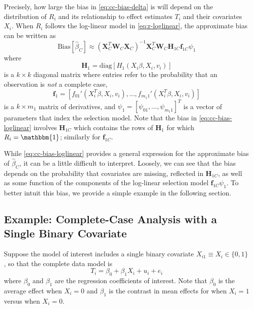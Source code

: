 \documentclass[
]{article}
\begin{document}
Precisely, how large the bias in \eqref{eq:cc-bias-delta} is will depend on the distribution of \(R_i\) and its relationship to effect estimates \(T_i\) and their covariates \(X_i\).
When \(R_i\) follows the log-linear model in \eqref{eq:r-loglinear}, the approximate bias can be written as
\begin{equation}
\text{Bias}[\hat{\beta}_C]
  \approx (\mathbf{X}_C^T \mathbf{W}_C \mathbf{X}_C)^{-1} \mathbf{X}_C^T \mathbf{W}_C \mathbf{H}_{1C}  \mathbf{f}_{1C} \psi_1
\label{eq:cc-bias-loglinear}
\end{equation}
where
\[
\mathbf{H}_1 = \text{diag}[H_1(X_i\beta, X_i, v_i)]
\]
is a \(k \times k\) diagonal matrix where entries refer to the probability that an observation is \emph{not} a complete case,
\[
\mathbf{f}_1 = \left[f_{01}'(X_i^T\beta, X_i, v_i), \ldots, f_{m_1 1}'(X_i^T\beta, X_i, v_i) \right]
\]
is a \(k \times m_1\) matrix of derivatives, and \(\psi_1 = [\psi_{01}, \ldots, \psi_{m_1 1}]^T\) is a vector of parameters that index the selection model.
Note that the bias in \eqref{eq:cc-bias-loglinear} involves \(\mathbf{H}_{1C}\) which contains the rows of \(\mathbf{H}_1\) for which \(R_i = \mathbbm{1}\); similarly for \(\mathbf{f}_{1C}\).

While \eqref{eq:cc-bias-loglinear} provides a general expression for the approximate bias of \(\hat{\beta}_C\), it can be a little difficult to interpret.
Loosely, we can see that the bias depends on the probability that covariates are missing, reflected in \(\mathbf{H}_{1C}\), as well as some function of the components of the log-linear selection model \(\mathbf{f}_{1C} \psi_1\).
To better intuit this bias, we provide a simple example in the following section.

\hypertarget{example-complete-case-analysis-with-a-single-binary-covariate}{%
\subsection{Example: Complete-Case Analysis with a Single Binary Covariate}\label{example-complete-case-analysis-with-a-single-binary-covariate}}

Suppose the model of interest includes a single binary covariate \(X_{i1} \equiv X_i \in \{0, 1\}\), so that the complete data model is
\begin{equation}
T_i = \beta_0 + \beta_1 X_i + u_i + e_i
\label{eq:cc-example}
\end{equation}
where \(\beta_0\) and \(\beta_1\) are the regression coefficients of interest.
Note that \(\beta_0\) is the average effect when \(X_i = 0\) and \(\beta_1\) is the contrast in mean effects for when \(X_i = 1\) versus when \(X_i = 0\).
\end{document}
